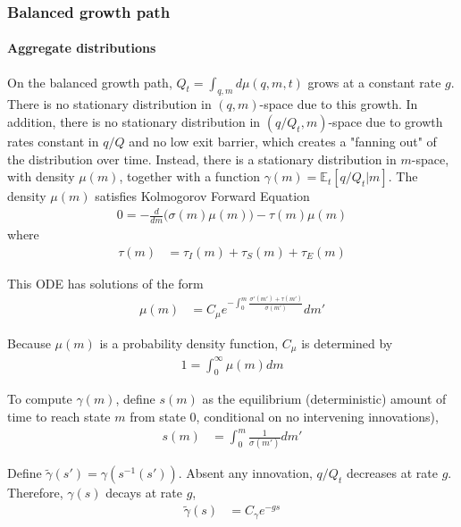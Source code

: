 \documentclass[11pt,english]{article}
\theoremstyle{remark}
\begin{document}
\subsubsection{Balanced growth path}\label{bgp}

\paragraph{Aggregate distributions} 

On the balanced growth path, $Q_t = \int_{q,m} d\mu(q,m,t)$ grows at a constant rate $g$. There is no stationary distribution in $(q,m)$-space due to this growth. In addition, there is no stationary distribution in $(q/Q_t,m)$-space due to growth rates constant in $q/Q$ and no low exit barrier, which creates a "fanning out" of the distribution over time. Instead, there is a stationary distribution in $m$-space, with density $\mu(m)$, together with a function $\gamma(m) = \mathbb{E}_t[q/Q_t|m]$. The density $\mu(m)$ satisfies Kolmogorov Forward Equation
\begin{align}
	0 = - \frac{d}{dm} \Big( \sigma(m) \mu(m) \Big) - \tau(m) \mu(m)  \label{KF_equation}
\end{align}
where
\begin{align}
	\tau(m) &= \tau_I(m) + \tau_S(m) + \tau_E(m) 
\end{align}

This ODE has solutions of the form
\begin{align}
	\mu(m) &= C_\mu e^{-\int_0^m \frac{\sigma'(m') + \tau(m')}{\sigma(m')}} dm' \label{KF_solution_1}
\end{align}

Because $\mu(m)$ is a probability density function, $C_\mu$ is determined by
\begin{align}
	1 = \int_0^{\infty} \mu(m) dm \label{KF_solution_2}
\end{align}

To compute $\gamma(m)$, define $s(m)$ as the equilibrium (deterministic) amount of time to reach state $m$ from state $0$, conditional on no intervening innovations), 
\begin{align}
	s(m) &= \int_0^m \frac{1}{\sigma(m')} dm'
\end{align}

Define $\tilde{\gamma}(s') = \gamma(s^{-1}(s'))$. Absent any innovation, $q/Q_t$ decreases at rate $g$. Therefore, $\gamma(s)$ decays at rate $g$, 
\begin{align}
	\tilde{\gamma}(s) &= C_{\gamma} e^{-gs}
\end{align}
\end{document}
